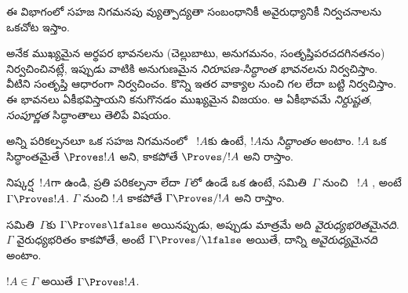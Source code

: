 \documentclass[../../../include/open-logic-section]{subfiles}
\begin{document}
      {}
      {}


\begin{editorial}
ఈ విభాగంలో సహజ నిగమనపు వ్యుత్పాద్యతా సంబంధానికీ అవైరుధ్యానికీ
నిర్వచనాలను ఒకచోట ఇస్తాం.
\end{editorial}

\begin{explain}
అనేక ముఖ్యమైన అర్థపర భావనలను (చెల్లుబాటు, అనుగమనం, సంతృప్తిపరచదగినతనం)
నిర్వచించినట్లే, ఇప్పుడు వాటికి అనుగుణమైన \emph{నిరూపణ-సిద్ధాంత
భావనలను} నిర్వచిస్తాం. వీటిని  
సంతృప్తి ఆధారంగా నిర్వచించం. కొన్ని  ఇతర
వాక్యాల నుంచి గల  లేదా  బట్టి
నిర్వచిస్తాం. ఈ భావనలు ఏకీభవిస్తాయని కనుగొనడం ముఖ్యమైన
విజయం. ఆ ఏకీభావమే \emph{నిర్దుష్టత}, \emph{సంపూర్ణత}
సిద్ధాంతాలు తెలిపే విషయం.
\end{explain}


\begin{defn}[సిద్ధాంతాలు]
అన్ని పరికల్పనలూ  ఒక  సహజ నిగమనంలో
~$!A$కు ఉంటే, $!A$ను
\emph{సిద్ధాంతం} అంటాం. $!A$ ఒక సిద్ధాంతమైతే $\Proves !A$ అని,
కాకపోతే $\Proves/ !A$ అని రాస్తాం.
\end{defn}

\begin{defn}
నిష్కర్ష~$!A$గా ఉండి, ప్రతి పరికల్పనా  లేదా
$\Gamma$లో ఉండే ఒక  ఉంటే, 
సమితి~$\Gamma$ నుంచి ~$!A$ \emph{}, అంటే
$\Gamma \Proves !A$. $\Gamma$ నుంచి $!A$  కాకపోతే
$\Gamma \Proves/ !A$ అని రాస్తాం.
\end{defn}

\begin{defn}[అవైరుధ్యం]
 సమితి~$\Gamma$కు $\Gamma \Proves \lfalse$ అయినప్పుడు,
అప్పుడు మాత్రమే అది \emph{వైరుధ్యభరితమైనది}. $\Gamma$ వైరుధ్యభరితం
కాకపోతే, అంటే $\Gamma \Proves/ \lfalse$ అయితే, దాన్ని
\emph{అవైరుధ్యమైనది} అంటాం.
\end{defn}

\begin{prop}[స్వావర్తనత్వం]
$!A \in \Gamma$ అయితే $\Gamma \Proves !A$.
\end{prop}
\end{document}
